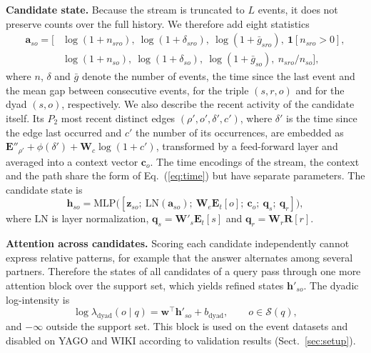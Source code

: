 \documentclass[runningheads]{llncs}
\newcommand{\lam}{\lambda}
\newcommand{\para}[1]{\smallskip\noindent\textbf{#1}}
\begin{document}
\para{Candidate state.} Because the stream is truncated to $L$ events, it does not preserve counts over the full history. We therefore add eight statistics
\begin{equation}
  \begin{aligned}
  \mathbf{a}_{so} = \big[&\log(1{+}n_{sro}),\ \log(1{+}\delta_{sro}),\ \log(1{+}\bar{g}_{sro}),\ \mathbf{1}[n_{sro} {>} 0],\\
  &\log(1{+}n_{so}),\ \log(1{+}\delta_{so}),\ \log(1{+}\bar{g}_{so}),\ n_{sro}/n_{so}\big],
  \end{aligned}
\end{equation}
where $n$, $\delta$ and $\bar{g}$ denote the number of events, the time since the last event and the mean gap between consecutive events, for the triple $(s, r, o)$ and for the dyad $(s, o)$, respectively. We also describe the recent activity of the candidate itself. Its $P_2$ most recent distinct edges $(\rho', o', \delta', c')$, where $\delta'$ is the time since the edge last occurred and $c'$ the number of its occurrences, are embedded as $\mathbf{E}''_{\rho'} + \phi(\delta') + \mathbf{W}_c \log(1 + c')$, transformed by a feed-forward layer and averaged into a context vector $\mathbf{c}_o$. The time encodings of the stream, the context and the path share the form of Eq.~(\ref{eq:time}) but have separate parameters. The candidate state is
\begin{equation}
  \mathbf{h}_{so} = \mathrm{MLP}\big([\mathbf{z}_{so};\ \mathrm{LN}(\mathbf{a}_{so});\ \mathbf{W}_e \mathbf{E}_t[o];\ \mathbf{c}_o;\ \mathbf{q}_s;\ \mathbf{q}_r]\big),
\end{equation}
where $\mathrm{LN}$ is layer normalization, $\mathbf{q}_s = \mathbf{W}'_s \mathbf{E}_t[s]$ and $\mathbf{q}_r = \mathbf{W}_r \mathbf{R}[r]$.

\para{Attention across candidates.} Scoring each candidate independently cannot express relative patterns, for example that the answer alternates among several partners. Therefore the states of all candidates of a query pass through one more attention block over the support set, which yields refined states $\mathbf{h}'_{so}$. The dyadic log-intensity is
\begin{equation}
  \log\lam_{\mathrm{dyad}}(o \mid q) = \mathbf{w}^\top \mathbf{h}'_{so} + b_{\mathrm{dyad}}, \qquad o \in \mathcal{S}(q),
\end{equation}
and $-\infty$ outside the support set. This block is used on the event datasets and disabled on YAGO and WIKI according to validation results (Sect.~\ref{sec:setup}).
\end{document}
